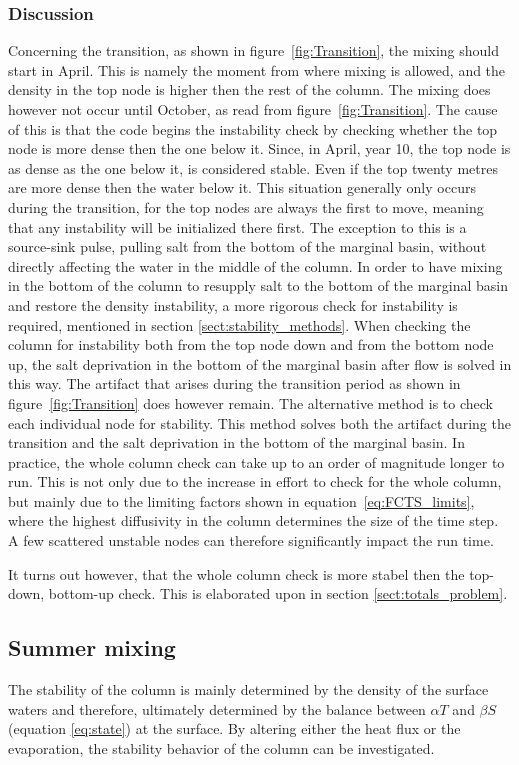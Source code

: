 \documentclass[twocolumn]{article}
\begin{document}
\subsubsection{Discussion}
Concerning the transition, as shown in figure~\ref{fig:Transition}, the mixing should start in April. This is namely the moment from where mixing is allowed, and the density in the top node is higher then the rest of the column. The mixing does however not occur until October, as read from figure~\ref{fig:Transition}. The cause of this is that the code begins the instability check by checking whether the top node is more dense then the one below it. Since, in April, year 10, the top node is as dense as the one below it, is considered stable. Even if the top twenty metres are more dense then the water below it. This situation generally only occurs during the transition, for the top nodes are always the first to move, meaning that any instability will be initialized there first. The exception to this is a source-sink pulse, pulling salt from the bottom of the marginal basin, without directly affecting the water in the middle of the column. In order to have mixing in the bottom of the column to resupply salt to the bottom of the marginal basin and restore the density instability, a more rigorous check for instability is required, mentioned in section \ref{sect:stability_methods}. When checking the column for instability both from the top node down and from the bottom node up, the salt deprivation in the bottom of the marginal basin after flow is solved in this way. The artifact that arises during the transition period as shown in figure~\ref{fig:Transition} does however remain.
The alternative method is to check each individual node for stability. This method solves both the artifact during the transition and the salt deprivation in the bottom of the marginal basin. In practice, the whole column check can take up to an order of magnitude longer to run. This is not only due to the increase in effort to check for the whole column, but mainly due to the limiting factors shown in equation~\ref{eq:FCTS_limits}, where the highest diffusivity in the column determines the size of the time step. A few scattered unstable nodes can therefore significantly impact the run time. 

It turns out however, that the whole column check is more stabel then the top-down, bottom-up check. This is elaborated upon in section \ref{sect:totals_problem}.

\subsection{Summer mixing}
The stability of the column is mainly determined by the density of the surface waters and therefore, ultimately determined by the balance between $\alpha T$ and $\beta S$ (equation \ref{eq:state}) at the surface. By altering either the heat flux or the evaporation, the stability behavior of the column can be investigated.
\end{document}
